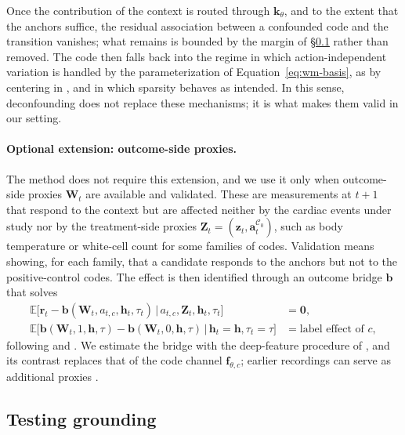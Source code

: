 Once the contribution of the context is routed through $\mathbf{k}_\theta$, and to the extent that the anchors suffice, the residual association between a confounded code and the transition vanishes; what remains is bounded by the margin of \S\ref{sec:wm-test} rather than removed. The code then falls back into the regime in which action-independent variation is handled by the parameterization of Equation~\eqref{eq:wm-basis}, as by centering in \citet{li2026dueling}, and in which sparsity \citep{lei2025spartan,lachapelle2026sparsity} behaves as intended. In this sense, deconfounding does not replace these mechanisms; it is what makes them valid in our setting.

\paragraph{Optional extension: outcome-side proxies.}
The method does not require this extension, and we use it only when outcome-side proxies $\mathbf{W}_t$ are available and validated. These are measurements at $t+1$ that respond to the context but are affected neither by the cardiac events under study nor by the treatment-side proxies $\mathbf{Z}_t=(\mathbf{z}_t,\mathbf{a}^{\mathcal{C}_0}_t)$, such as body temperature or white-cell count for some families of codes. Validation means showing, for each family, that a candidate responds to the anchors but not to the positive-control codes. The effect is then identified through an outcome bridge $\mathbf{b}$ that solves
\begin{align}
\mathbb{E}\big[\mathbf{r}_t-\mathbf{b}(\mathbf{W}_t,a_{t,c},\mathbf{h}_t,\tau_t)\,\big|\,a_{t,c},\mathbf{Z}_t,\mathbf{h}_t,\tau_t\big]&=\mathbf{0}, \label{eq:wm-bridge}\\
\mathbb{E}\big[\mathbf{b}(\mathbf{W}_t,1,\mathbf{h},\tau)-\mathbf{b}(\mathbf{W}_t,0,\mathbf{h},\tau)\,\big|\,\mathbf{h}_t=\mathbf{h},\tau_t=\tau\big]&=\text{label effect of }c, \label{eq:wm-bridge-effect}
\end{align}
following \citet{miao2018proxy} and \citet{tchetgen2020proximal}. We estimate the bridge with the deep-feature procedure of \citet{xu2021dfpv}, and its contrast replaces that of the code channel $\mathbf{f}_{\theta,c}$; earlier recordings can serve as additional proxies \citep{lu2023pessimism}.

\subsection{Testing grounding}
\label{sec:wm-test}

